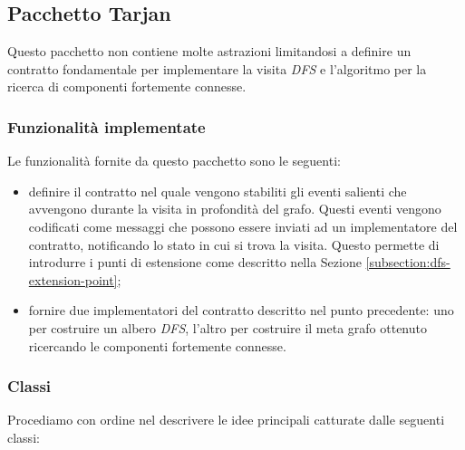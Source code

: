 \subsection{Pacchetto Tarjan}
Questo pacchetto non contiene molte astrazioni limitandosi a definire un
contratto fondamentale per implementare la visita \emph{DFS} e
l'algoritmo per la ricerca di componenti fortemente connesse.

\subsubsection*{Funzionalit\`a implementate}
Le funzionalit\`a fornite da questo pacchetto sono le seguenti:
\begin{itemize}
\item definire il contratto nel quale vengono stabiliti gli eventi
  salienti che avvengono durante la visita in profondit\`a del
  grafo. Questi eventi vengono codificati come messaggi che possono
  essere inviati ad un implementatore del contratto, notificando lo
  stato in cui si trova la visita. Questo permette di introdurre i
  punti di estensione come descritto nella Sezione
  \ref{subsection:dfs-extension-point};
\item fornire due implementatori del contratto descritto nel punto
  precedente: uno per costruire un albero \emph{DFS}, l'altro per
  costruire il meta grafo ottenuto ricercando le componenti fortemente
  connesse.
\end{itemize}

\subsubsection*{Classi}
Procediamo con ordine nel descrivere le idee principali catturate
dalle seguenti classi:

